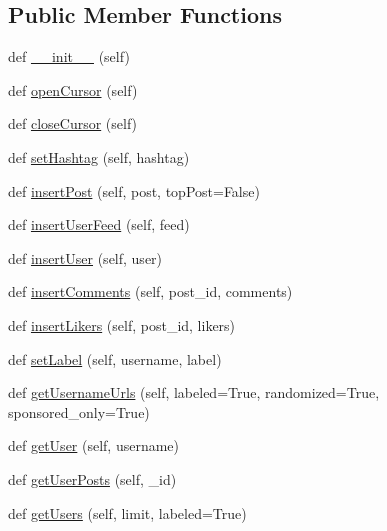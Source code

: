 \subsection*{Public Member Functions}
\begin{DoxyCompactItemize}
\item 
def \mbox{\hyperlink{classsql__client_1_1_sql_client_a6800fef274fbc6b3f5f27fe2e69aa4f0}{\+\_\+\+\_\+init\+\_\+\+\_\+}} (self)
\item 
def \mbox{\hyperlink{classsql__client_1_1_sql_client_aa2dae62cb52cef01e2023a00e3abeeab}{open\+Cursor}} (self)
\item 
def \mbox{\hyperlink{classsql__client_1_1_sql_client_a19f3afe71ef8d46c5c364b9e5727b681}{close\+Cursor}} (self)
\item 
def \mbox{\hyperlink{classsql__client_1_1_sql_client_a5c2da9bb6e47f3f316e3fff6c34bc70e}{set\+Hashtag}} (self, hashtag)
\item 
def \mbox{\hyperlink{classsql__client_1_1_sql_client_ab8870e714acfd8d94d5f2d632447725f}{insert\+Post}} (self, post, top\+Post=False)
\item 
def \mbox{\hyperlink{classsql__client_1_1_sql_client_a18816b3e7e51cc678cec67b3b85ebb5d}{insert\+User\+Feed}} (self, feed)
\item 
def \mbox{\hyperlink{classsql__client_1_1_sql_client_a6c838651c15d3d7484c7082dc1377be0}{insert\+User}} (self, user)
\item 
def \mbox{\hyperlink{classsql__client_1_1_sql_client_a2266364e6779025ae03f25ef42a056be}{insert\+Comments}} (self, post\+\_\+id, comments)
\item 
def \mbox{\hyperlink{classsql__client_1_1_sql_client_aeb4b2806e4055304d7005ac2173b7453}{insert\+Likers}} (self, post\+\_\+id, likers)
\item 
def \mbox{\hyperlink{classsql__client_1_1_sql_client_a5bacb4e196cb6addb7b1c2c7e1c92c4f}{set\+Label}} (self, username, label)
\item 
def \mbox{\hyperlink{classsql__client_1_1_sql_client_a1f19e8375847e847b0c0dc13dd4930c3}{get\+Username\+Urls}} (self, labeled=True, randomized=True, sponsored\+\_\+only=True)
\item 
def \mbox{\hyperlink{classsql__client_1_1_sql_client_aabd735d4f088517fb4354be42713a65d}{get\+User}} (self, username)
\item 
def \mbox{\hyperlink{classsql__client_1_1_sql_client_ae5bd5fba97db2686788dbd05cca758c4}{get\+User\+Posts}} (self, \+\_\+id)
\item 
def \mbox{\hyperlink{classsql__client_1_1_sql_client_a40842f3f655d0256a1accdec40e731b4}{get\+Users}} (self, limit, labeled=True)

\end{DoxyCompactItemize}
